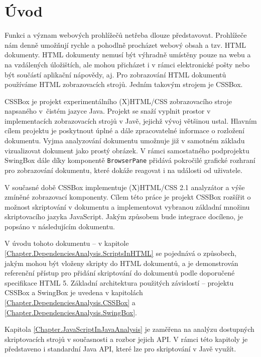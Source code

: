 
\chapter{Úvod}
\label{Chapter.Introducion}

Funkci a význam webových prohlížečů netřeba dlouze představovat. Prohlížeče nám denně umožňují rychle a pohodlně procházet webový obsah a tzv. HTML dokumenty. HTML dokumenty nemusí být výhradně umístěny pouze na webu a na vzdálených úložištích, ale mohou přicházet i v rámci elektronické pošty nebo být součástí aplikační nápovědy, aj. Pro zobrazování HTML dokumentů používáme HTML zobrazovacích strojů. Jedním takovým strojem je CSSBox.

CSSBox je projekt experimentálního (X)HTML/CSS zobrazovacího stroje napsaného v~čistém jazyce Java. Projekt se snaží vyplnit prostor v implementacích zobrazovacích strojů v Javě, jejichž vývoj většinou ustal. Hlavním cílem projektu je poskytnout úplné a dále zpracovatelné informace o rozložení dokumentu. Vyjma analyzování dokumentu umožnuje již v samotném základu vizualizovat dokument jako prostý obrázek. V rámci samostatného podprojektu SwingBox dále díky komponentě \texttt{BrowserPane} přidává pokročilé grafické rozhraní pro zobrazování dokumentu, které dokáže reagovat i na události od uživatele.

V současné době CSSBox implementuje (X)HTML/CSS 2.1 analyzátor a výše zmíněné zobrazovací komponenty. Cílem této práce je projekt CSSBox rozšířit o možnost skriptování v dokumentu a implementovat vybranou základní množinu skriptovacího jazyka JavaScript. Jakým způsobem bude integrace docíleno, je popsáno v následujícím dokumentu.

V úvodu tohoto dokumentu -- v kapitole \ref{Chapter.DependenciesAnalysis.ScriptsInHTML} se pojednává o způsobech, jakým mohou být vloženy skripty do HTML dokumentů, a je demonstrován referenční přístup pro přidání skriptování do dokumentů podle doporučené specifikace HTML 5. Základní architektura použitých závislostí -- projektu CSSBox a SwingBox je uvedena v kapitolách \ref{Chapter.DependenciesAnalysis.CSSBox} a \ref{Chapter.DependenciesAnalysis.SwingBox}.

Kapitola \ref{Chapter.JavaScriptInJavaAnalysis} je zaměřena na analýzu dostupných skriptovacích strojů v současnosti a rozbor jejich API. V rámci této kapitoly je představeno i standardní Java API, které lze pro skriptování v Javě využít.

